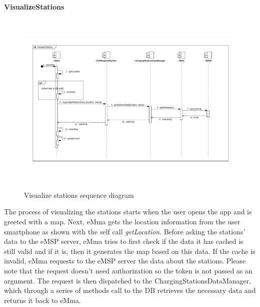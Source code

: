 \paragraph{VisualizeStations}\mbox{}\\
\begin{figure}[H]
    \centering
    \includegraphics[trim={0 3cm 0 1cm},clip, width=1\textwidth]{Images/cp2/runtime/VisualizeStations.pdf}
    \caption{Visualize stations sequence diagram}
\end{figure}
\pagebreak
The process of visualizing the stations starts when the user opens the app and is greeted with a map. Next, eMma gets the location information from the user smartphone as shown with the self call \textit{getLocation}. Before asking the stations' data to the eMSP server, eMma tries to first check if the data it has cached is still valid and if it is, then it generates the map based on this data. If the cache is invalid, eMma requests to the eMSP server the data about the stations. Please note that the request doesn't need authorization so the token is not passed as an argument. The request is then dispatched to the ChargingStationsDataManager, which through a series of methods call to the DB retrieves the necessary data and returns it back  to eMma.

